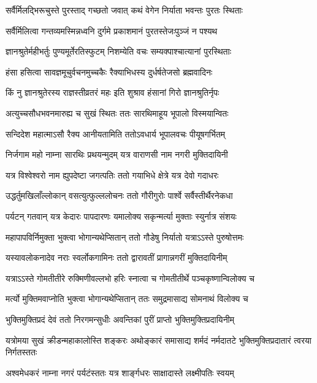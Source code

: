 \twolineshloka
{सर्वैर्मिलद्भिरूचुस्ते पुरस्ताद् गच्छतो जवात्}
{कथं वेगेन निर्याता भवन्तः पुरतः स्थिताः} %

\twolineshloka
{सर्वैर्मिलित्वा गन्तव्यमस्मिन्नध्वनि दुर्गमे}
{प्रकाशमानं पुरतस्तेजःपुञ्जं न पश्यथ} %

\twolineshloka
{ज्ञानश्रुतेर्महीभर्तुः पुण्यमूर्तेरतिस्फुटम्}
{निशम्येति वचः सम्यक्पाश्चात्यानां पुरस्थिताः} %

\twolineshloka
{हंसा हसित्वा सावज्ञमूचुर्वचनमुच्चकैः}
{रैक्याभिधस्य दुर्धर्षतेजसो ब्रह्मवादिनः} %

\twolineshloka
{किं नु ज्ञानश्रुतेरस्य राज्ञस्तीव्रतरं महः}
{इति शुश्राव हंसानां गिरो ज्ञानश्रुतिर्नृपः} %

\twolineshloka
{अत्युच्चसौधभवनमारुह्य च सुखं स्थितः}
{ततः सारथिमाहूय भूपालो विस्मयान्वितः} %

\twolineshloka
{सन्दिदेश महात्माऽसौ रैक्य आनीयतामिति}
{ततोऽवधार्य भूपालवचः पीयूषगर्भितम्} %

\twolineshloka
{निर्जगाम महो नाम्ना सारथिः प्रथयन्मुदम्}
{यत्र वाराणसी नाम नगरी मुक्तिदायिनी} %

\twolineshloka
{यत्र विश्वेश्वरो नाम ह्युपदेष्टा जगत्पतिः}
{ततो गयाभिधे क्षेत्रे यत्र देवो गदाधरः} %

\twolineshloka
{उद्धर्तुमखिलाँल्लोकान् वसत्युत्फुल्ललोचनः}
{ततो गौरीगुरोः पार्श्वे सर्वैस्तीर्थैरनेकधा} %

\twolineshloka
{पर्यटन् गतवान् यत्र केदारः पापदारणः}
{यमालोक्य सकृन्मर्त्या मुक्ताः स्युर्नात्र संशयः} %

\twolineshloka
{महापापविर्निमुक्ता भुक्त्वा भोगान्यथेप्सितान्}
{ततो गौडेषु निर्यातो यत्राऽऽस्ते पुरुषोत्तमः} %

\twolineshloka
{यस्यावलोकनादेव नराः स्वर्लोकगामिनः}
{ततो द्वारावतीं प्रागान्नगरीं मुक्तिदायिनीम्} %

\twolineshloka
{यत्राऽऽस्ते गोमतीतीरे रुक्मिणीवल्लभो हरिः}
{स्नात्वा च गोमतीतीर्थे पञ्चकृष्णान्विलोक्य च} %

\twolineshloka
{मर्त्यो मुक्तिमवाप्नोति भुक्त्वा भोगान्यथेप्सितान्}
{ततः समुद्रमासाद्य सोमनाथं विलोक्य च} %

\twolineshloka
{भुक्तिमुक्तिप्रदं देवं ततो निरगमन्सुधीः}
{अवन्तिकां पुरीं प्राप्तो भुक्तिमुक्तिप्रदायिनीम्} %

\threelineshloka
{यत्रोमया सुखं क्रीडन्महाकालोस्ति शङ्करः}
{अथोङ्कारं समासाद्य शर्मदं नर्मदातटे}
{भुक्तिमुक्तिप्रदातारं त्वरया निर्गतस्ततः} %

\twolineshloka
{अश्वमेधकरं नाम्ना नगरं पर्यटंस्ततः}
{यत्र शार्ङ्गधरः साक्षादास्ते लक्ष्मीपतिः स्वयम्} %

